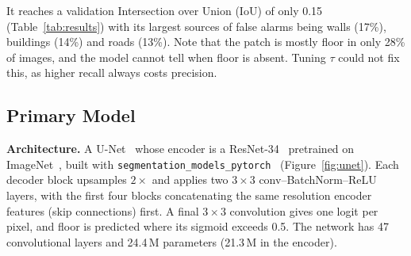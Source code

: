 \documentclass[final]{article}
\begin{document}
It reaches a validation Intersection over Union (IoU) of only 0.15 (Table~\ref{tab:results}) with its largest 
sources of false alarms being walls (17\%), buildings (14\%) and roads (13\%). Note that the patch is mostly 
floor in only 28\% of images, and the model cannot tell when floor is absent. Tuning $\tau$ could not fix this,
as higher recall always costs precision.

\subsection*{Primary Model}

\textbf{Architecture.} A U-Net~\citep{ronneberger2015unet} whose encoder is a
ResNet-34~\citep{he2016resnet} pretrained on ImageNet~\citep{deng2009imagenet}, built with
\texttt{segmentation\_models\_pytorch}~\citep{iakubovskii2019smp} (Figure~\ref{fig:unet}). Each decoder block 
upsamples $2\times$ and applies two $3\times3$ conv--BatchNorm--ReLU layers, with the first four blocks 
concatenating the same resolution encoder features (skip connections) first. A final $3{\times}3$ convolution
gives one logit per pixel, and floor is predicted where its sigmoid exceeds 0.5. The network has 47 convolutional
layers and 24.4\,M parameters (21.3\,M in the encoder).
\end{document}
